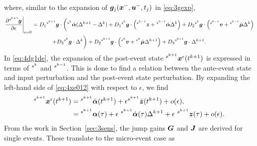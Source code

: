 \documentclass[../DC2017114Bouma.tex]{subfiles}
\begin{document}
where, similar to the expansion of ${\boldsymbol{g}}_j({\boldsymbol{x}}^-,{\boldsymbol{u}}^-,t_j)$ in \eqref{eq:3gexp},
\begin{multline}
\left.\frac{\partial\hspace{0cm}^{s^{k+1}}{\boldsymbol{g}}}{\partial\epsilon}\right|_{\epsilon=0} = D_1\hspace{0cm}^{s^{k+1}}{\boldsymbol{g}}\cdot\bigg(\hspace{0cm}^{s^k}\dot{\boldsymbol{\alpha}}(\Delta^{k+1}-\Delta^{k}) + D_1\hspace{0cm}^{s^k}{\boldsymbol{g}}\cdot\left(\hspace{0cm}^{s^{k-1}}{\boldsymbol{z}}+\hspace{0cm}^{s^{k-1}}\dot{\boldsymbol{\alpha}}\Delta^{k}\right) + D_2\hspace{0cm}^{s^k}{\boldsymbol{g}}\cdot\left(\hspace{0cm}^{s^{k-1}}{\boldsymbol{v}}+\hspace{0cm}^{s^{k-1}}\dot{\boldsymbol{\mu}}\Delta^{k}\right) \\ + D_3\hspace{0cm}^{s^k}{\boldsymbol{g}}\cdot\Delta^{k} \bigg)+ D_2 \hspace{0cm}^{s^{k+1}}{\boldsymbol{g}}\cdot\left(\hspace{0cm}^{s^{k}}{\boldsymbol{v}}+\hspace{0cm}^{s^{k}}\dot{\boldsymbol{\mu}}\Delta^{k+1} \right) + D_3\hspace{0cm}^{s^{k+1}}{\boldsymbol{g}}\cdot\Delta^{k+1}. \label{eq:4dg1de}
\end{multline}
In \eqref{eq:4dg1de}, the expansion of the post-event state $\hspace{0cm}^{s^{k+1}}{\boldsymbol{x}}^\epsilon(t^{k+1})$ is expressed in terms of $\hspace{0cm}^{s^{k}}$ and $\hspace{0cm}^{s^{k-1}}$. This is done to find a relation between the ante-event state and input perturbation and the post-event state perturbation. By expanding the left-hand side of \eqref{eq:4xe012} with respect to $\epsilon$, we find
\begin{align}
\ls^{s^{k+1}}\xb^\epsilon(t^{k+1}) &= \ls^{s^{k+1}}\bar{\alphab}(t^{k+1})+\epsilon\ls^{s^{k+1}}\bar{\zb}(t^{k+1}) + o(\epsilon),\\
&= \ls^{s^{k+1}}\alphab(\tau) + \epsilon\ ^{s^{k+1}}\dot{\alphab}(\tau)\Delta^{k+1} + \epsilon\ ^{s^{k+1}}\zb(\tau) + o(\epsilon).\label{eq:4xexp}
\end{align}
From the work in Section~\ref{sec:3sens}, the jump gains ${\boldsymbol{G}}$ and ${\boldsymbol{J}}$ are derived for single events. These translate to the micro-event case as
\end{document}
